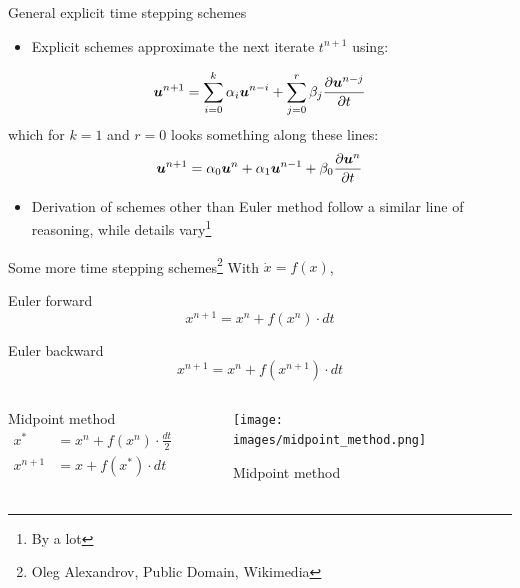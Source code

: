 \documentclass[presentation]{beamer}
\newcommand{\gv}[1]{\ensuremath{\mbox{\boldmath$ #1 $}}}
\begin{document}
\begin{frame}[label={sec:org2812740}]{General explicit time stepping schemes}
\begin{itemize}
\item Explicit schemes approximate the next iterate \(t^{n+1}\) using:
\end{itemize}
\[ \gv{u}^{n+1} = \sum_{i=0}^{k} \alpha_i \gv{u}^{n-i} + \sum_{j=0}^{r} \beta_j \frac{\partial \gv{u}^{n-j}}{\partial t} \]
  which for \(k=1\) and \(r=0\) looks something along these lines:
\[ \gv{u}^{n+1} = \alpha_0 \gv{u}^{n} + \alpha_1 \gv{u}^{n-1} + \beta_0 \frac{\partial \gv{u}^{n}}{\partial t} \]
\begin{itemize}
\item Derivation of schemes other than Euler method follow a similar line of reasoning, while
details vary\footnote{By a \alert{lot}}
\end{itemize}
\end{frame}
\begin{frame}[label={sec:org51794ba}]{Some more time stepping schemes\footnote{Oleg Alexandrov, Public Domain, Wikimedia}}
With \(\dot{x} = f(x)\),
\begin{block}{Euler forward}
\[ x^{n+1} = x^{n} + f(x^{n}) \cdot dt \]
\end{block}
\begin{block}{Euler backward}
\[ x^{n+1} = x^{n} + f(x^{n+1}) \cdot dt \]
\end{block}
\begin{columns}
\begin{column}{0.5\columnwidth}
\begin{block}{Midpoint method}
\begin{equation*}
\begin{aligned}
x^{*}&= x^{n} + f({x}^{n}) \cdot \frac{dt}{2} \\
x^{n+1} &= x + f({x}^{*}) \cdot dt \\
\end{aligned}
\end{equation*}
\end{block}
\end{column}
\begin{column}{0.4\columnwidth}
\begin{figure}[htbp]
\centering
\texttt{[image: images/midpoint\_method.png]}
\caption{Midpoint method}
\end{figure}
\end{column}
\end{columns}
\end{frame}
\end{document}
